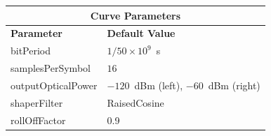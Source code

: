 \begin{refsection}
\begin{table}[H]
			\centering
			\footnotesize
	\begin{tabular}{|l|l|}
		\hline
		\multicolumn{2}{|c|}{ \textbf{Curve Parameters} } \\
		\hline
		\textbf{Parameter}     & \textbf{Default Value}                                     \\\hline
		bitPeriod              & $1/50\times10^9$~s														\\\hline
		samplesPerSymbol       & $16$                                                       \\\hline
		outputOpticalPower     & $-120$~dBm (left), $-60$~dBm (right)                       \\ \hline
		shaperFilter	       & RaisedCosine												\\ \hline
		rollOffFactor		   & 0.9														\\ \hline
		

\end{tabular}
\end{table}
\end{refsection}
